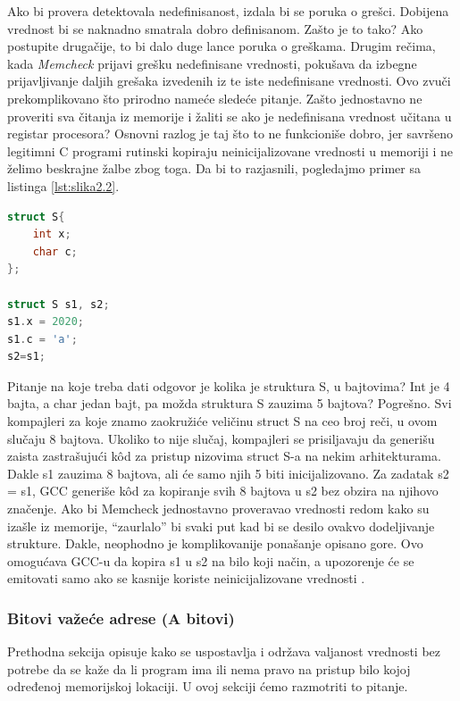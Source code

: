 \documentclass[12pt,oneside]{memoir}
\theoremstyle{plain}
\theoremstyle{definition}
\begin{document}
Ako bi provera detektovala nedefinisanost, izdala bi se poruka o grešci. Dobijena vrednost bi se naknadno smatrala dobro definisanom. Zašto je to tako? Ako postupite drugačije, to bi dalo duge lance poruka o greškama. Drugim rečima, kada \textit{Memcheck} prijavi grešku nedefinisane vrednosti, pokušava da izbegne prijavljivanje daljih grešaka izvedenih iz te iste nedefinisane vrednosti. Ovo zvuči prekomplikovano što prirodno nameće sledeće pitanje. Zašto jednostavno ne proveriti sva čitanja iz memorije i žaliti se ako je nedefinisana vrednost učitana u registar procesora? Osnovni razlog je taj što to ne funkcioniše dobro, jer savršeno legitimni C programi rutinski kopiraju neinicijalizovane vrednosti u memoriji i ne želimo beskrajne žalbe zbog toga. Da bi to razjasnili, pogledajmo primer sa listinga \ref{lst:slika2.2}.

\begin{lstlisting}[caption={Primer kratkog segmenta koda}, label={lst:slika2.2},language={C}] 
struct S{
	int x;
	char c;
};

struct S s1, s2;
s1.x = 2020;
s1.c = 'a';
s2=s1;
\end{lstlisting}


Pitanje na koje treba dati odgovor je kolika je struktura S, u bajtovima? Int je 4 bajta, a char jedan bajt, pa možda struktura S zauzima 5 bajtova? Pogrešno. Svi kompajleri za koje znamo zaokružiće veličinu struct S na ceo broj reči, u ovom slučaju 8 bajtova. Ukoliko to nije slučaj, kompajleri  se prisiljavaju da generišu zaista zastrašujući k\^od za pristup nizovima struct S-a na nekim arhitekturama. Dakle s1 zauzima 8 bajtova, ali će samo njih 5 biti inicijalizovano. Za zadatak s2 = s1, GCC generiše k\^od za kopiranje svih 8 bajtova u s2 bez obzira na njihovo značenje. Ako bi Memcheck jednostavno proveravao vrednosti redom kako su izašle iz memorije, “zaurlalo”  bi svaki put kad bi se desilo ovakvo dodeljivanje strukture. Dakle, neophodno je komplikovanije ponašanje opisano gore. Ovo omogućava GCC-u da kopira s1 u s2 na bilo koji način, a upozorenje će se emitovati samo ako se kasnije koriste neinicijalizovane vrednosti \cite{Memcheck}. 

\subsubsection{Bitovi važeće adrese (A bitovi)}
Prethodna sekcija opisuje kako se uspostavlja i održava valjanost vrednosti bez potrebe da se kaže da li program ima ili nema pravo na pristup bilo kojoj određenoj memorijskoj lokaciji. U ovoj sekciji ćemo razmotriti to pitanje.
\end{document}
